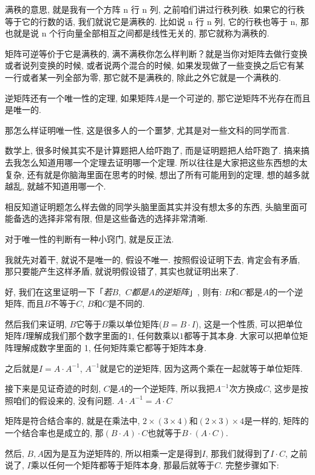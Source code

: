 满秩的意思, 就是我有一个方阵 n 行 n 列, 之前咱们讲过行秩列秩. 如果它的行秩等于它的行数的话, 我们就说它是满秩的. 比如说 n 行 n 列, 它的行秩也等于 n, 那也就是说 n 个行向量全部相互之间都是线性无关的, 那它就称为满秩的. 

矩阵可逆等价于它是满秩的, 满不满秩你怎么样判断？就是当你对矩阵去做行变换或者说列变换的时候, 或者说两个混合的时候, 如果发现做了一些变换之后它有某一行或者某一列全部为零, 那它就不是满秩的, 除此之外它就是一个满秩的. 

逆矩阵还有一个唯一性的定理, 如果矩阵$A$是一个可逆的, 那它逆矩阵不光存在而且是唯一的. 

那怎么样证明唯一性, 这是很多人的一个噩梦, 尤其是对一些文科的同学而言. 

数学上, 很多时候其实不是计算题把人给吓跑了, 而是证明题把人给吓跑了. 搞来搞去我怎么知道用哪一个定理去证明哪一个定理. 所以往往是大家把这些东西想的太复杂, 还有就是你脑海里面在思考的时候, 想出了所有可能用到的定理, 想的越多就越乱, 就越不知道用哪一个. 

相反知道证明题怎么样去做的同学头脑里面其实并没有想太多的东西, 头脑里面可能备选的选择非常有限, 但是这些备选的选择非常清晰. 

对于唯一性的判断有一种小窍门, 就是反正法. 

我就先对着干, 就说不是唯一的, 假设不唯一. 按照假设证明下去, 肯定会有矛盾, 那只要能产生这样矛盾, 就说明假设错了, 其实也就证明出来了. 

好, 我们在这里证明一下「\textit{若$B,$ $C$都是$A$的逆矩阵}」,  则有: $B$和$C$都是$A$的一个逆矩阵, 而且$B$不等于$C$, $B$和$C$是不同的. 

然后我们来证明, $B$它等于$B$乘以单位矩阵($B = B\cdot I$), 这是一个性质, 可以把单位矩阵$I$理解成我们那个数字里面的$1$, 任何数乘以$1$都等于其本身. 大家可以把单位矩阵理解成数字里面的 1, 任何矩阵乘它都等于矩阵本身. 

之后就是$I = A \cdot A^{-1}$, $A^{-1}$就是它的逆矩阵, 因为这两个乘在一起就等于单位矩阵. 

接下来是见证奇迹的时刻, $C$是$A$的一个逆矩阵, 所以我把$A^{-1}$次方换成$C$, 这步是按照咱们的假设来的, 没有问题. $A\cdot A^{-1} = A \cdot C$ 

矩阵是符合结合率的, 就是在乘法中, $2\times (3 \times 4)$和$(2 \times 3) \times 4$是一样的, 矩阵的一个结合率也是成立的, 那$(B\cdot A) \cdot C$也就等于$B \cdot (A \cdot C)$. 

然后, $B, A$因为是互为逆矩阵的, 所以相乘一定是得到$I$, 那我们就得到了$I \cdot C$, 之前说了, $I$乘以任何一个矩阵都等于矩阵本身, 那最后就等于$C$. 完整步骤如下:

